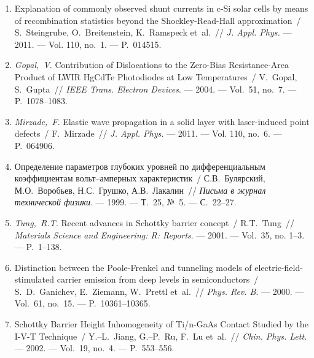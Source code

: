 \begin{center}
\textbf{\MakeUppercase{\fullbibtitle}}
\end{center}

\begin{enumerate}[label=\arabic*$^*$.,leftmargin=0em,itemindent=3em]
\item
Explanation of commonly observed shunt currents in c-Si solar cells by means of
  recombination statistics beyond the Shockley-Read-Hall approximation~/
  S.~Steingrube, O.~Breitenstein, K.~Ramspeck et~al.~// \emph{J.
  Appl. Phys.} ---
  2011. --- 
  Vol. 110, no.~1. ---
  P.~014515.



\item
\emph{Gopal,~V}. Contribution of Dislocations to the Zero-Bias
  Resistance-Area Product of {LWIR} {H}g{C}d{T}e Photodiodes at Low
  Temperatures~/ V.~Gopal, S.~Gupta~// \emph{IEEE Trans. Electron
  Devices}. ---
  2004. ---
  Vol.~51, no.~7. ---
  P.~1078--1083.

\item
\emph{Mirzade,~F}. Elastic wave propagation in a solid layer with
  laser-induced point defects~/ F.~Mirzade~// \emph{J. Appl. Phys.} ---
  2011. ---
  Vol. 110, no.~6. ---
  P.~064906.

\item
Определение параметров глубоких уровней
  по дифференциальным коэффициентам
  вольт--амперных характеристик~/
  С.В.~Булярский, М.О.~Воробьев, Н.С.~Грушко,
  А.В.~Лакалин~// \emph{Письма в журнал
  технической физики}. ---
  1999. ---
  Т.~25, {№}~5. ---
  {С.}~22--27.

\item
\emph{Tung,~R.T.} Recent advances in {S}chottky barrier concept~/
  R.T.~Tung~// \emph{Materials Science and Engineering: R: Reports}.
  ---
  2001. --- 
  Vol.~35, no. 1--3. ---
  P.~1--138.

\item
Distinction between the {P}oole-{F}renkel and tunneling models of
  electric-field-stimulated carrier emission from deep levels in
  semiconductors~/ S.~D.~Ganichev, E.~Ziemann, W.~Prettl et~al.~//
  \emph{Phys. Rev. B}. ---
  2000. --- 
  Vol.~61, no.~15. ---
  P.~10361--10365.

\item
Schottky Barrier Height Inhomogeneity of Ti/n-GaAs Contact Studied by the I-V-T
  Technique~/ Y.--L.~Jiang, G.--P.~Ru, F.~Lu et~al.~// \emph{Chin.
  Phys. Lett.} ---
  2002. ---
  Vol.~19, no.~4. ---
  P.~553--556.


\end{enumerate}
